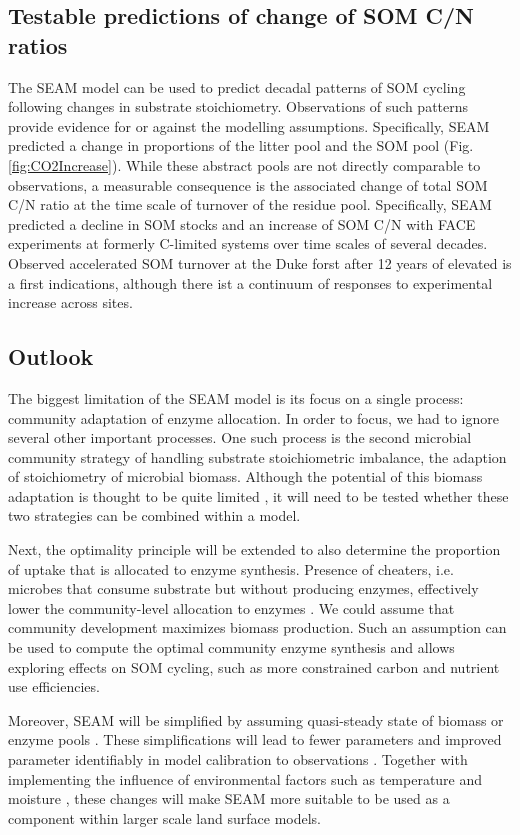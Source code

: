 \subsection{Testable predictions of change of SOM C/N ratios}
The SEAM model can be used to predict decadal patterns of SOM cycling following
changes in substrate stoichiometry. Observations of such patterns provide evidence
for or against the modelling assumptions.
Specifically, SEAM predicted a change in proportions of the litter pool and the
SOM pool (Fig. \ref{fig:CO2Increase}). While these abstract pools are not
directly comparable to observations, a measurable consequence is the associated
change of total SOM C/N ratio at the time scale of turnover of the residue
pool. Specifically, SEAM predicted a decline in SOM stocks and an increase of
SOM C/N with FACE experiments at formerly C-limited systems over time scales of
several decades. Observed accelerated SOM turnover at the Duke forst after 12
years of elevated  \citep{Drake11} is a first indications, although
there ist a continuum of responses to experimental  increase across sites.
 
\subsection{Outlook} 
The biggest limitation of the SEAM model is its focus on a single process:
community adaptation of enzyme allocation. In order to focus, we had to ignore
several other important processes. One such process is the second microbial
community strategy of handling substrate stoichiometric imbalance, the adaption
of stoichiometry of microbial biomass. Although the potential of this biomass
adaptation is thought to be quite limited \citep{Mooshammer14}, it will need to
be tested whether these two strategies can be combined within a model.

Next, the optimality principle will be extended to also determine the proportion
of uptake that is allocated to enzyme synthesis. Presence of cheaters, i.e.
microbes that consume substrate but without producing enzymes, effectively lower
the community-level allocation to enzymes \citep{Kaiser14}. We could assume
that community development maximizes biomass production. Such
an assumption can be used to compute the optimal community enzyme synthesis and allows
exploring effects on SOM cycling, such as more constrained carbon and nutrient
use efficiencies.

Moreover, SEAM will be simplified by assuming quasi-steady state of biomass or
enzyme pools \citep{Wutzler13}. These simplifications will lead to fewer
parameters and improved parameter identifiably in model calibration to
observations \citep{Xu14}.
Together with implementing the influence of environmental factors such as
temperature and moisture \citep{Davidson12}, these changes will make SEAM more
suitable to be used as a component within larger scale land surface models.
 
